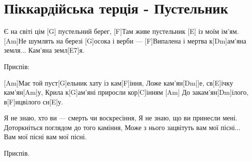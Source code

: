 \section{Піккардійська терція - Пустельник}
\begin{guitar}
[Am]Є на світі цім [G] пустельний берег,
[F]Там живе пустельник [E] із моїм ім’ям.
[Am]Не шумлять на березі [G]осока і верби —
[F]Випалена і мертва к[Dm]ам’яна земля...
Кам’яна земл[E7]я.

Приспів:

[Am]Має той пуст[G]ельник хату із кам[F]іння,
Ложе кам’ян[Dm|]е, св[E]ічку кам’ян[Am]у,
Крила к[G]ам’яні приросли кор[C]інням
[Am]   До закам’ян[Dm]ілого, в[F]ицвілого сн[E]у.

Я не знаю, хто ви — смерть чи воскресіння,
Я не знаю, що ви принесли мені.
Доторкніться поглядом до того каміння,
Може з нього зацвітуть вам мої пісні...
Вам мої пісні вам мої пісні.

Приспів.
\end{guitar}